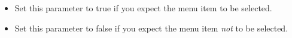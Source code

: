
\begin{itemize}
\item Set this parameter to true if you expect the menu item to be selected. 
\item  Set this parameter to false if you expect the menu item \emph{not} to be selected.
\end{itemize}
